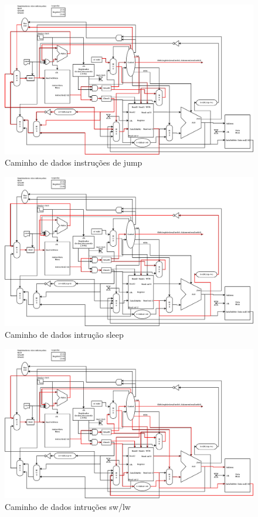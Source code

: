 \documentclass[a4paper, 10pt]{article}
\begin{document}
\begin{figure}[H]
	\centering
	\includegraphics[scale=0.12]{dp_jump.png}
	\caption{Caminho de dados instruções de jump}
	\label{Rotulo}
\end{figure}
\begin{figure}[H]
	\centering
	\includegraphics[scale=0.12]{dp_sleep.png}
	\caption{Caminho de dados intrução sleep}
	\label{Rotulo}
\end{figure}
\begin{figure}[H]
	\centering
	\includegraphics[scale=0.12]{dp_mem.png}
	\caption{Caminho de dados intruções sw/lw}
	\label{Rotulo}
\end{figure}
\newpage
\end{document}

